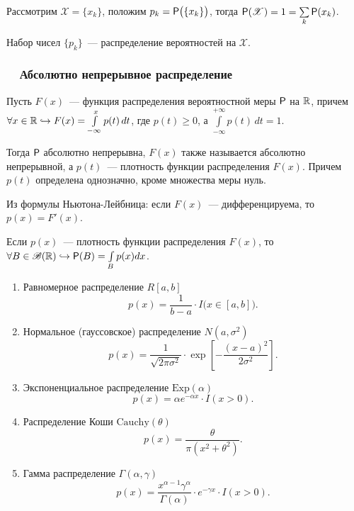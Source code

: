 Рассмотрим $\mathscr{X} = \{ x_k \}$, положим $p_k = \P \big( \{x_k \} \big)$, тогда $\P( \mathscr{X} ) = 1 = \sum\limits_{k} \P ( x_k )$.

\begin{definition}
	Набор чисел $\{ p_k \}$~--- распределение вероятностей на $\mathscr{X}$.
\end{definition}

\subsubsection*{~~Абсолютно непрерывное распределение}
\begin{definition}
	Пусть $F(x)$~--- функция распределения вероятностной меры $\P$ на $\R$, причем $\forall x \in \R \hookrightarrow F(x) = \int\limits_{-\infty}^{x} p(t) \, d t$, где  $p(t) \geqslant 0$, а $\int\limits_{-\infty}^{+\infty} p(t) \, d t = 1$. 
	
	Тогда $\P$ абсолютно непрерывна, $F(x)$ также называется абсолютно непрерывной, а $p(t)$~--- плотность функции распределения $F(x)$. Причем $p(t)$ определена однозначно, кроме множества меры нуль.
	
	Из формулы Ньютона-Лейбница: если $F(x)$~--- дифференцируема, то $p(x) = F'(x)$.
	
	Если $p(x)$~--- плотность функции распределения $F(x)$, то $\forall B \in \B(\R) \hookrightarrow \P(B) = \int\limits_{B} p(x)dx$.
\end{definition}

\begin{enumerate}
	\item{Равномерное распределение $R[a,b]$ 
		$$p(x) = \frac{1}{b -a } \cdot I \big( x \in [a,b] \big). $$
	}
		
	\item{Нормальное (гауссовское) распределение $N(a, \sigma^2)$
		$$p(x) = \frac{1}{\sqrt{2 \pi \sigma^2}} \cdot \exp \left[ -\frac{(x - a)^2}{2 \sigma^2} \right]. $$
	}
		
	\item{Экспоненциальное распределение $\text{Exp}(\alpha)$
	    $$p(x) = \alpha e^{-\alpha x} \cdot I(x > 0).$$
	}
	
	\item{Распределение Коши $\text{Cauchy}(\theta)$
		$$p(x) = \frac{\theta}{\pi \left(x^2 + \theta^2 \right)}.$$
	}
		
	\item{Гамма распределение $\Gamma(\alpha, \gamma)$
		$$p(x) = \frac{x^{\alpha - 1} \gamma^{\alpha}}{\Gamma(\alpha)} \cdot e^{-\gamma x} \cdot I(x > 0).$$
	}
\end{enumerate}

